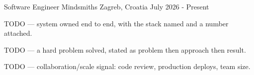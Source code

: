 
\begin{cventries}

%
%
%
  \cventry
    {Software Engineer} %
    {Mindsmiths} %
    {Zagreb, Croatia} %
    {July 2026 - Present} %
    {
      \begin{cvitems}
        \item {TODO — system owned end to end, with the stack named and a number attached.}
        \item {TODO — a hard problem solved, stated as problem then approach then result.}
        \item {TODO — collaboration/scale signal: code review, production deploys, team size.}
      \end{cvitems}
      \vspace{4mm}
    }


\end{cventries}
